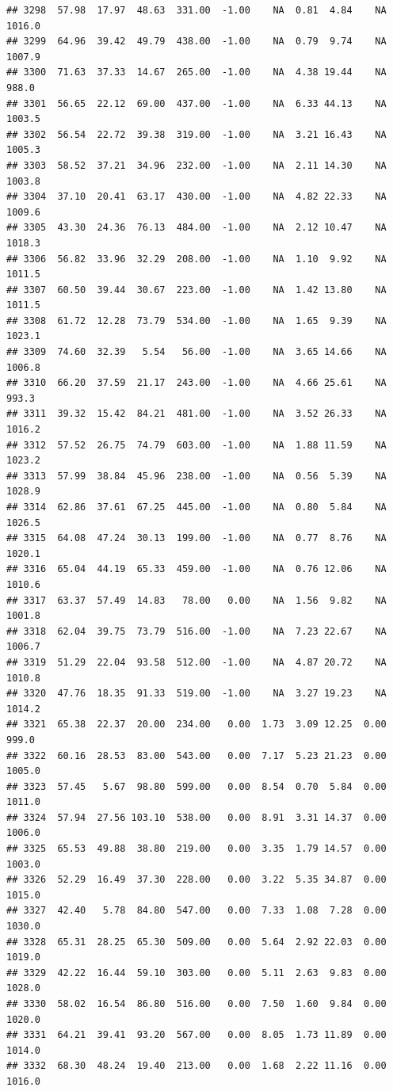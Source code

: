 \documentclass{article}\usepackage{graphicx, color}
\makeatletter
\newenvironment{kframe}{%
 \def\at@end@of@kframe{}%
 \ifinner\ifhmode%
  \def\at@end@of@kframe{\end{minipage}}%
  \begin{minipage}{\columnwidth}%
 \fi\fi%
 \def\FrameCommand##1{\hskip\@totalleftmargin \hskip-\fboxsep
 \colorbox{shadecolor}{##1}\hskip-\fboxsep
     \hskip-\linewidth \hskip-\@totalleftmargin \hskip\columnwidth}%
 \MakeFramed {\advance\hsize-\width
   \@totalleftmargin\z@ \linewidth\hsize
   \@setminipage}}%
 {\par\unskip\endMakeFramed%
 \at@end@of@kframe}
\newenvironment{knitrout}{}{} %
\makeatother
\begin{document}
\begin{knitrout}
\begin{kframe}
\begin{verbatim}
## 3298  57.98  17.97  48.63  331.00  -1.00    NA  0.81  4.84    NA 1016.0
## 3299  64.96  39.42  49.79  438.00  -1.00    NA  0.79  9.74    NA 1007.9
## 3300  71.63  37.33  14.67  265.00  -1.00    NA  4.38 19.44    NA  988.0
## 3301  56.65  22.12  69.00  437.00  -1.00    NA  6.33 44.13    NA 1003.5
## 3302  56.54  22.72  39.38  319.00  -1.00    NA  3.21 16.43    NA 1005.3
## 3303  58.52  37.21  34.96  232.00  -1.00    NA  2.11 14.30    NA 1003.8
## 3304  37.10  20.41  63.17  430.00  -1.00    NA  4.82 22.33    NA 1009.6
## 3305  43.30  24.36  76.13  484.00  -1.00    NA  2.12 10.47    NA 1018.3
## 3306  56.82  33.96  32.29  208.00  -1.00    NA  1.10  9.92    NA 1011.5
## 3307  60.50  39.44  30.67  223.00  -1.00    NA  1.42 13.80    NA 1011.5
## 3308  61.72  12.28  73.79  534.00  -1.00    NA  1.65  9.39    NA 1023.1
## 3309  74.60  32.39   5.54   56.00  -1.00    NA  3.65 14.66    NA 1006.8
## 3310  66.20  37.59  21.17  243.00  -1.00    NA  4.66 25.61    NA  993.3
## 3311  39.32  15.42  84.21  481.00  -1.00    NA  3.52 26.33    NA 1016.2
## 3312  57.52  26.75  74.79  603.00  -1.00    NA  1.88 11.59    NA 1023.2
## 3313  57.99  38.84  45.96  238.00  -1.00    NA  0.56  5.39    NA 1028.9
## 3314  62.86  37.61  67.25  445.00  -1.00    NA  0.80  5.84    NA 1026.5
## 3315  64.08  47.24  30.13  199.00  -1.00    NA  0.77  8.76    NA 1020.1
## 3316  65.04  44.19  65.33  459.00  -1.00    NA  0.76 12.06    NA 1010.6
## 3317  63.37  57.49  14.83   78.00   0.00    NA  1.56  9.82    NA 1001.8
## 3318  62.04  39.75  73.79  516.00  -1.00    NA  7.23 22.67    NA 1006.7
## 3319  51.29  22.04  93.58  512.00  -1.00    NA  4.87 20.72    NA 1010.8
## 3320  47.76  18.35  91.33  519.00  -1.00    NA  3.27 19.23    NA 1014.2
## 3321  65.38  22.37  20.00  234.00   0.00  1.73  3.09 12.25  0.00  999.0
## 3322  60.16  28.53  83.00  543.00   0.00  7.17  5.23 21.23  0.00 1005.0
## 3323  57.45   5.67  98.80  599.00   0.00  8.54  0.70  5.84  0.00 1011.0
## 3324  57.94  27.56 103.10  538.00   0.00  8.91  3.31 14.37  0.00 1006.0
## 3325  65.53  49.88  38.80  219.00   0.00  3.35  1.79 14.57  0.00 1003.0
## 3326  52.29  16.49  37.30  228.00   0.00  3.22  5.35 34.87  0.00 1015.0
## 3327  42.40   5.78  84.80  547.00   0.00  7.33  1.08  7.28  0.00 1030.0
## 3328  65.31  28.25  65.30  509.00   0.00  5.64  2.92 22.03  0.00 1019.0
## 3329  42.22  16.44  59.10  303.00   0.00  5.11  2.63  9.83  0.00 1028.0
## 3330  58.02  16.54  86.80  516.00   0.00  7.50  1.60  9.84  0.00 1020.0
## 3331  64.21  39.41  93.20  567.00   0.00  8.05  1.73 11.89  0.00 1014.0
## 3332  68.30  48.24  19.40  213.00   0.00  1.68  2.22 11.16  0.00 1016.0

\end{verbatim}
\end{kframe}
\end{knitrout}
\end{document}

